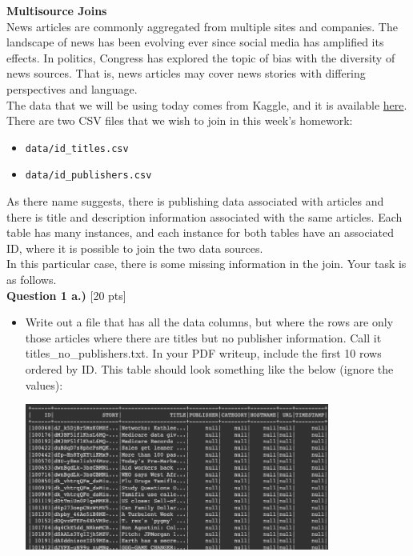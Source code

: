 \documentclass[paper=a4, fontsize=11pt]{scrartcl} %
\author{
    \textbf{YOUR NAME} \\ 
    \textbf{YOUR GIT USERNAME} \\ 
    \textbf{YOUR E-MAIL}
}%
\begin{document}
\maketitle %


{\huge \textbf{Multisource Joins}}  \\

News articles are commonly aggregated from multiple sites and companies. The landscape of news has been evolving ever since social media has amplified its effects. In politics, Congress has explored the topic of bias with the diversity of news sources. That is, news articles may cover news stories with differing perspectives and language. \\

The data that we will be using today comes from Kaggle, and it is available \href{https://course.ccs.neu.edu/cs6220/homework-3/}{here}. There are two CSV files that we wish to join in this week's homework:

\begin{itemize}
    \item \verb"data/id_titles.csv"
    \item \verb"data/id_publishers.csv"
\end{itemize}

As there name suggests, there is publishing data associated with articles and there is title and description information associated with the same articles. Each table has many instances, and each instance for both tables have an associated ID, where it is possible to join the two data sources. \\

In this particular case, there is some missing information in the join. Your task is as follows. \\

{\Large \textbf{Question 1 a.)} [20 pts]}
\begin{itemize}
    \item Write out a file that has all the data columns, but where the rows are only those articles where there are titles but no publisher information. Call it titles\_no\_publishers.txt. In your PDF writeup, include the first 10 rows ordered by ID. This table should look something like the below (ignore the values): \\
    \begin{center}
    \includegraphics[width=100mm]{images/pub_no_title.png} \\
    \end{center}
\end{itemize}
\end{document}
